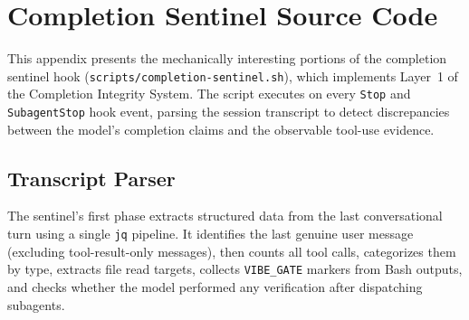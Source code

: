 \section{Completion Sentinel Source Code}
\label{app:sentinel}

This appendix presents the mechanically interesting portions of the completion
sentinel hook (\texttt{scripts/completion-sentinel.sh}), which implements
Layer~1 of the Completion Integrity System. The script executes on every
\texttt{Stop} and \texttt{SubagentStop} hook event, parsing the session
transcript to detect discrepancies between the model's completion claims
and the observable tool-use evidence.

\subsection{Transcript Parser}

The sentinel's first phase extracts structured data from the last
conversational turn using a single \texttt{jq} pipeline. It identifies the
last genuine user message (excluding tool-result-only messages), then counts
all tool calls, categorizes them by type, extracts file read targets,
collects \texttt{VIBE\_GATE} markers from Bash outputs, and checks whether
the model performed any verification after dispatching subagents.


